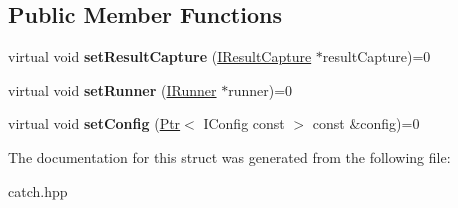 \subsection*{Public Member Functions}
\begin{DoxyCompactItemize}
\item 
\mbox{\label{structCatch_1_1IMutableContext_a4a80afd0525b7def21bee8d9b48f2d39}} 
virtual void {\bfseries set\+Result\+Capture} (\hyperlink{structCatch_1_1IResultCapture}{I\+Result\+Capture} $\ast$result\+Capture)=0
\item 
\mbox{\label{structCatch_1_1IMutableContext_af2e53b1dea4527a2587cff266a730f6e}} 
virtual void {\bfseries set\+Runner} (\hyperlink{structCatch_1_1IRunner}{I\+Runner} $\ast$runner)=0
\item 
\mbox{\label{structCatch_1_1IMutableContext_a013e8f688a8ea7970262d07ead542a63}} 
virtual void {\bfseries set\+Config} (\hyperlink{classCatch_1_1Ptr}{Ptr}$<$ I\+Config const $>$ const \&config)=0
\end{DoxyCompactItemize}


The documentation for this struct was generated from the following file\+:\begin{DoxyCompactItemize}
\item 
catch.\+hpp\end{DoxyCompactItemize}
